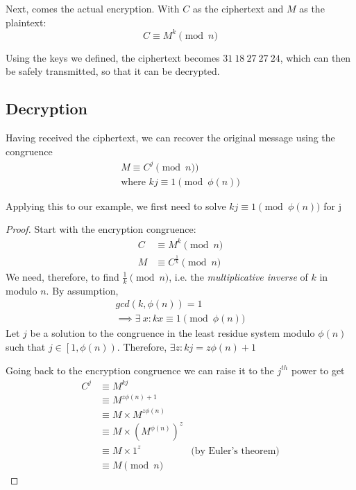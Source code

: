 \documentclass{article}
\begin{document}
    Next, comes the actual encryption. With $C$ as the ciphertext and $M$ as the plaintext:
    \begin{equation*}
        C \equiv M^{k} \pmod{n}
    \end{equation*}

    Using the keys we defined, the ciphertext becomes $31\ 18\ 27\ 27\ 24$, which can then be safely
    transmitted, so that it can be decrypted.

    \subsection{Decryption}
    Having received the ciphertext, we can recover the original message using the congruence
    \begin{align*}
        M \equiv C^j \pmod{n})\\
        \text{where } kj \equiv 1 \pmod{\phi (n)}
    \end{align*}

    Applying this to our example, we first need to solve $kj \equiv 1 \pmod{\phi (n)}$ for j

    \begin{proof}
        Start with the encryption congruence: 
        \begin{align*}
            C & \equiv M^{k} \pmod{n}\\
            M & \equiv C^{\frac{1}{k}} \pmod{n}
        \end{align*}
        We need, therefore, to find $\frac{1}{k} \pmod{n}$, i.e. the \emph{multiplicative inverse}
        of $k$ in modulo $n$. By assumption, 
        \begin{align*}
            gcd(k, \phi (n)) = 1 \\
            \implies \exists\ x: kx \equiv 1 \pmod{\phi (n)}
        \end{align*}
        Let $j$ be a solution to the congruence in the least residue system modulo $\phi (n)$ such that 
        $j \in \left[1, \phi (n) \right)$. Therefore, $\exists z: kj = z\phi (n) + 1$

        Going back to the encryption congruence we can raise it to the $j^{th}$ power to get
        \begin{align*}
            C^j & \equiv M^{kj}\\ 
                & \equiv M^{z\phi (n) + 1}\\
                & \equiv M\times M^{z \phi(n)}\\
                & \equiv M\times (M^{\phi (n)})^z\\
                & \equiv M\times 1^z                &\text{(by Euler's theorem)}\\
                & \equiv M \pmod{n}
        \end{align*}
    \end{proof}
\end{document}
